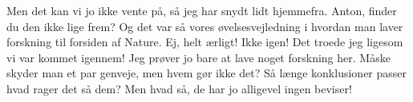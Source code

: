 \documentclass[a4paper,11pt]{article}
\begin{document}
\begin{sketch}
 Men det kan vi jo ikke vente på, så jeg har snydt lidt hjemmefra. Anton, finder du den ikke lige frem?
 Og det var så vores øvelsesvejledning i hvordan man laver forskning til forsiden af Nature. 
 Ej, helt ærligt! Ikke igen! Det troede jeg ligesom vi var kommet igennem! Jeg prøver jo bare at lave noget forskning her. Måske skyder man et par genveje, men hvem gør ikke det? Så længe konklusioner passer hvad rager det så dem? Men hvad så, de har jo alligevel ingen beviser! 
\end{sketch}
\end{document}
